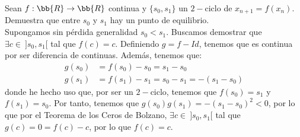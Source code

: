 \begin{ejercicio} \label{ej:2.8}
    Sean $f: \bb{R} \to \bb{R}$ continua y $\{s_0, s_1\}$ un $2-$ciclo de $x_{n+1} = f(x_n)$. Demuestra que entre $s_0$ y $s_1$ hay un punto de equilibrio.\\

    Supongamos sin pérdida generalidad $s_0<s_1$. Buscamos demostrar que $\exists c\in~]s_0,s_1[$ tal que $f(c)=c$. Definiendo $g=f-Id$, tenemos que es continua por ser diferencia de continuas. Además, tenemos que:
    \begin{align*}
        g(s_0)&=f(s_0)-s_0 = s_1-s_0 \\
        g(s_1)&= f(s_1)-s_1 = s_0-s_1 = -(s_1-s_0)
    \end{align*}
    donde he hecho uso que, por ser un $2-$ciclo, tenemos que $f(s_0)=s_1$ y $f(s_1)=s_0$. Por tanto, tenemos que $g(s_0)g(s_1)=-(s_1-s_0)^2<0$, por lo que por el Teorema de los Ceros de Bolzano, $\exists c\in~]s_0,s_1[$ tal que $g(c)=0=f(c)-c$, por lo que $f(c)=c$.
\end{ejercicio}

